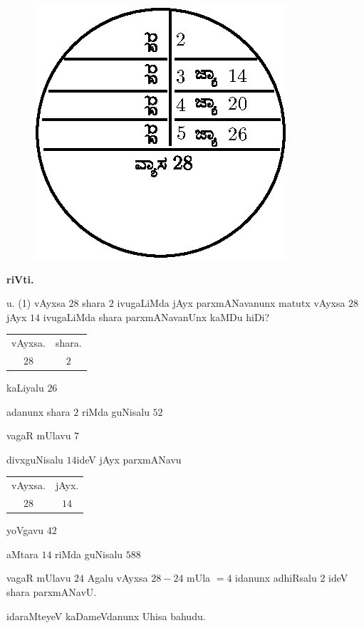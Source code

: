\begin{figure}[H]
\centering
\includegraphics{figure/fig37.eps}
\end{figure}

\begin{center}
{\bf riVti.}
\end{center}

u. {\rm(1)} vAyxsa $28$ shara $2$ ivugaLiMda jAyx parxmANavanunx
matutx vAyxsa $28$ jAyx $14$ ivugaLiMda shara parxmANavanUnx kaMDu
hiDi?

\medskip

\begin{tabular}{c@{\qquad}c}
vAyxsa. & shara.\\
$28$ & $2$
\end{tabular}
\smallskip

kaLiyalu $26$

adanunx shara $2$ riMda guNisalu $52$

vagaR mUlavu $7$

divxguNisalu $14$\quad ideV jAyx parxmANavu

\medskip

\begin{tabular}{c@{\qquad}c}
vAyxsa. & jAyx.\\[2pt]
$28$ & $14$
\end{tabular}
\smallskip

yoVgavu $42$

aMtara $14$ riMda guNisalu $588$

vagaR mUlavu $24$ Agalu vAyxsa $28-24$ mUla $=4$ idanunx adhiRsalu $2$
ideV shara parxmANavU.

idaraMteyeV kaDameVdanunx Uhisa bahudu.

